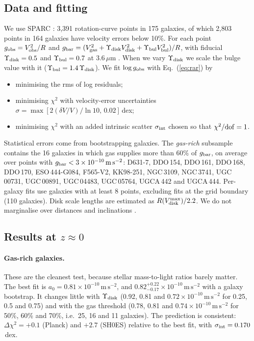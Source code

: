 \documentclass[11pt]{article}
\newcommand{\unit}[1]{\,\mathrm{#1}}
\newcommand{\aunit}{\times10^{-10}\unit{m\,s^{-2}}}
\begin{document}
\subsection{Data and fitting}

We use SPARC \citep{Lelli2016}: 3,391 rotation-curve points in 175 galaxies, of which 2,803 points in 164 galaxies have velocity errors below 10\%. For each point $g_{\rm obs}=V_{\rm obs}^2/R$ and $g_{\rm bar}=(V_{\rm gas}^2+\Upsilon_{\rm disk}V_{\rm disk}^2+\Upsilon_{\rm bul}V_{\rm bul}^2)/R$, with fiducial $\Upsilon_{\rm disk}=0.5$ and $\Upsilon_{\rm bul}=0.7$ at 3.6\,$\mu$m \citep{Lelli2016}. When we vary $\Upsilon_{\rm disk}$ we scale the bulge value with it ($\Upsilon_{\rm bul}=1.4\,\Upsilon_{\rm disk}$). We fit $\log g_{\rm obs}$ with Eq.~(\ref{eq:rar}) by
\begin{itemize}
\item minimising the rms of log residuals;
\item minimising $\chi^2$ with velocity-error uncertainties $\sigma=\max[2(\delta V/V)/\ln10,\,0.02]$\,dex;
\item minimising $\chi^2$ with an added intrinsic scatter $\sigma_{\rm int}$ chosen so that $\chi^2/{\rm dof}=1$.
\end{itemize}
Statistical errors come from bootstrapping galaxies. The \emph{gas-rich} subsample contains the 16 galaxies in which gas supplies more than 60\% of $g_{\rm bar}$, on average over points with $g_{\rm bar}<3\aunit$: D631-7, DDO\,154, DDO\,161, DDO\,168, DDO\,170, ESO\,444-G084, F565-V2, KK98-251, NGC\,3109, NGC\,3741, UGC\,00731, UGC\,00891, UGC\,04483, UGC\,05764, UGCA\,442 and UGCA\,444. Per-galaxy fits use galaxies with at least 8 points, excluding fits at the grid boundary (110 galaxies). Disk scale lengths are estimated as $R(V_{\rm disk}^{\rm max})/2.2$. We do not marginalise over distances and inclinations \citep{Li2018}.

\subsection{Results at $z\approx0$}

\paragraph{Gas-rich galaxies.} These are the cleanest test, because stellar mass-to-light ratios barely matter. The best fit is $a_0=0.81\aunit$, and $0.82^{+0.22}_{-0.17}\aunit$ with a galaxy bootstrap. It changes little with $\Upsilon_{\rm disk}$ (0.92, 0.81 and $0.72\aunit$ for 0.25, 0.5 and 0.75) and with the gas threshold (0.78, 0.81 and $0.74\aunit$ for 50\%, 60\% and 70\%, i.e.\ 25, 16 and 11 galaxies). The prediction is consistent: $\Delta\chi^2=+0.1$ (Planck) and $+2.7$ (SH0ES) relative to the best fit, with $\sigma_{\rm int}=0.170$\,dex.
\end{document}
